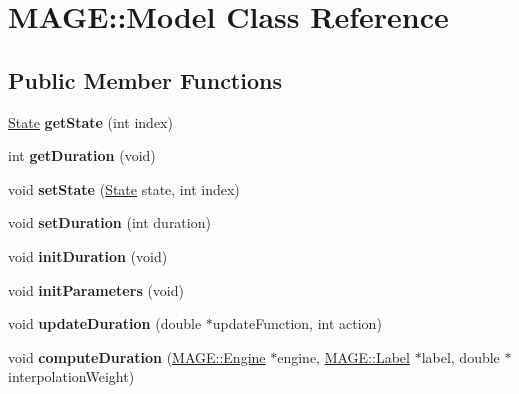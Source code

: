 \hypertarget{class_m_a_g_e_1_1_model}{\section{M\-A\-G\-E\-:\-:Model Class Reference}
\label{class_m_a_g_e_1_1_model}
}
\subsection*{Public Member Functions}
\begin{DoxyCompactItemize}
\item 
\hypertarget{class_m_a_g_e_1_1_model_a98f78c5746a9d3f6c58564e68fc5d256}{\hyperlink{struct_m_a_g_e_1_1_state}{State} {\bfseries get\-State} (int index)}\label{class_m_a_g_e_1_1_model_a98f78c5746a9d3f6c58564e68fc5d256}

\item 
\hypertarget{class_m_a_g_e_1_1_model_a2400f49e3b5901ed04436fcee9b49641}{int {\bfseries get\-Duration} (void)}\label{class_m_a_g_e_1_1_model_a2400f49e3b5901ed04436fcee9b49641}

\item 
\hypertarget{class_m_a_g_e_1_1_model_a4c3af53691987ae0c8d3f0d921da3f61}{void {\bfseries set\-State} (\hyperlink{struct_m_a_g_e_1_1_state}{State} state, int index)}\label{class_m_a_g_e_1_1_model_a4c3af53691987ae0c8d3f0d921da3f61}

\item 
\hypertarget{class_m_a_g_e_1_1_model_a59f493069f299cd68862c954791bcf34}{void {\bfseries set\-Duration} (int duration)}\label{class_m_a_g_e_1_1_model_a59f493069f299cd68862c954791bcf34}

\item 
\hypertarget{class_m_a_g_e_1_1_model_a9d8c1c2a881e496c9e49464b595b7a81}{void {\bfseries init\-Duration} (void)}\label{class_m_a_g_e_1_1_model_a9d8c1c2a881e496c9e49464b595b7a81}

\item 
\hypertarget{class_m_a_g_e_1_1_model_a0da8e90094bcf69179718334b1ad13b5}{void {\bfseries init\-Parameters} (void)}\label{class_m_a_g_e_1_1_model_a0da8e90094bcf69179718334b1ad13b5}

\item 
\hypertarget{class_m_a_g_e_1_1_model_a90a47244e550dfaf403ab9e28175af86}{void {\bfseries update\-Duration} (double $\ast$update\-Function, int action)}\label{class_m_a_g_e_1_1_model_a90a47244e550dfaf403ab9e28175af86}

\item 
\hypertarget{class_m_a_g_e_1_1_model_af32192860c3f1a173d45ee9cb529a976}{void {\bfseries compute\-Duration} (\hyperlink{class_m_a_g_e_1_1_engine}{M\-A\-G\-E\-::\-Engine} $\ast$engine, \hyperlink{class_m_a_g_e_1_1_label}{M\-A\-G\-E\-::\-Label} $\ast$label, double $\ast$interpolation\-Weight)}\label{class_m_a_g_e_1_1_model_af32192860c3f1a173d45ee9cb529a976}


\end{DoxyCompactItemize}
